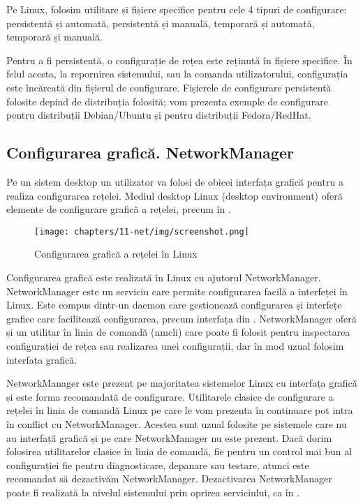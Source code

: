 Pe Linux, folosim utilitare și fișiere specifice pentru cele 4 tipuri de configurare: persistentă și automată, persistentă și manuală, temporară și automată, temporară și manuală.

Pentru a fi persistentă, o configurație de rețea este reținută în fișiere specifice. În felul acesta, la repornirea sistemului, sau la comanda utilizatorului, configurația este încărcată din fișierul de configurare. Fișierele de configurare persistentă folosite depind de distribuția folosită; vom prezenta exemple de configurare pentru distribuții Debian/Ubuntu și pentru distribuții Fedora/RedHat.

\subsection{Configurarea grafică. NetworkManager}
\label{sec:net:graphical-config}

Pe un sistem desktop un utilizator va folosi de obicei interfața grafică pentru a realiza configurarea rețelei. Mediul desktop Linux (desktop environment) oferă elemente de configurare grafică a rețelei, precum în .

\begin{figure}[!htbp]
  \centering
  \texttt{[image: chapters/11-net/img/screenshot.png]}
  \caption{Configurarea grafică a rețelei în Linux}
  \label{fig:net:linux-gui-config}
\end{figure}

Configurarea grafică este realizată în Linux cu ajutorul NetworkManager. NetworkManager este un serviciu care permite configurarea facilă a interfeței în Linux. Este compus dintr-un daemon care gestionează configurarea și interfețe grafice care facilitează configurarea, precum interfața din . NetworkManager oferă și un utilitar în linia de comandă (nmcli) care poate fi folosit pentru inspectarea configurației de rețea sau realizarea unei configurații, dar în mod uzual folosim interfața grafică.

NetworkManager este prezent pe majoritatea sistemelor Linux cu interfața grafică și este forma recomandată de configurare. Utilitarele clasice de configurare a rețelei în linia de comandă Linux pe care le vom prezenta în continuare pot intra în conflict cu NetworkManager. Acestea sunt uzual folosite pe sistemele care nu au interfață grafică și pe care NetworkManager nu este prezent. Dacă dorim folosirea utilitarelor clasice în linia de comandă, fie pentru un control mai bun al configurației fie pentru diagnosticare, depanare sau testare, atunci este recomandat să dezactivăm NetworkManager. Dezactivarea NetworkManager poate fi realizată la nivelul sistemului prin oprirea serviciului, ca în .

